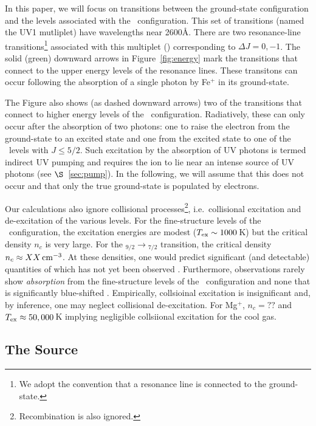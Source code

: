\documentclass[12pt,preprint]{aastex}
\begin{document}
In this paper, we will focus on transitions between the ground-state
configuration and the levels associated with the \zconfig\
configuration.  This set of transitions (named the
UV1 mutliplet) have wavelengths near 2600\AA.
There are two resonance-line transitions\footnote{We adopt the
  convention that a resonance line is connected to the ground-state.} 
associated with this multiplet (\feiid)
corresponding to $\Delta J = 0, -1$.  The solid (green) downward
arrows in Figure~\ref{fig:energy} mark the transitions that connect to
the upper energy levels of the resonance lines.  These transitons can
occur following the absorption of a single photon by Fe$^+$ in its
ground-state.  

The Figure also shows (as dashed downward arrows) two of the
transitions that connect to higher energy levels of the \zconfig\
configuration.  Radiatively, these can only occur after the absorption
of two photons: one to raise the electron from the ground-state to an
excited state and one from the excited state to one of the \zconfig\
levels with $J \le 5/2$.  Such excitation by the
absorption of UV photons is termed indirect UV pumping
\citep[e.g][]{sv02,pcb06} and requires the ion to lie
near an intense source of UV photons (see $\S$~\ref{sec:pump}).  In the
following, we will assume that this does not occur and that only the 
true ground-state is populated by electrons. 

Our calculations also ignore collisional
processes\footnote{Recombination is also ignored.}, i.e.\ collisional
excitation and de-excitation of the various levels.  For the
fine-structure levels of the \aconfig\ configuration, the excitation
energies are modest ($T_{\rm ex} \sim 1000$\,K) but the critical
density $n_c$ is very large.  For the \aconfig$_{9/2} \to
$\aconfig$_{7/2}$ transition, the critical density $n_c \approx XX
\, {\rm cm^{-3}}$.  At these densities, one would predict significant (and
detectable) quantities of \ion{Fe}{1} which has not yet been observed
\citep[see also][]{pcb06}.  Furthermore, observations rarely show
{\it absorption} from the
fine-structure levels of the \aconfig\ configuration and  none that is
significantly blue-shifted \citep{rubin+10}.
Empirically, collsioinal excitation is insignificant and, by
inference, one may neglect collisional de-excitation.  
For Mg$^+$, $n_c = ??$ and $T_{\rm ex} \approx 50,000$\,K  
implying negligible collsiional excitation for the cool gas.  

\subsection{The Source}
\end{document}
